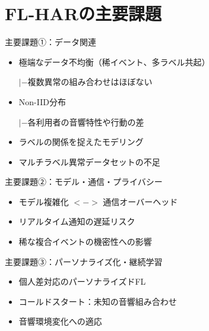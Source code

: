 \documentclass[unicode,12pt,aspectratio=169,dvipdfmx]{beamer}
\begin{document}
\section{FL-HARの主要課題}
\begin{frame}{主要課題①：データ関連}
  \begin{itemize}
    \item 極端なデータ不均衡（稀イベント、多ラベル共起）

    $|-$複数異常の組み合わせはほぼない
    \item Non-IID分布
    
    $|-$各利用者の音響特性や行動の差
    \item ラベルの関係を捉えたモデリング
    \item マルチラベル異常データセットの不足
  \end{itemize}
\end{frame}
\begin{frame}{主要課題②：モデル・通信・プライバシー}
  \begin{itemize}
    \item モデル複雑化 $<$$-$$>$ 通信オーバーヘッド
    \item リアルタイム通知の遅延リスク
    \item 稀な複合イベントの機密性への影響
  \end{itemize}
\end{frame}
\begin{frame}{主要課題③：パーソナライズ化・継続学習}
  \begin{itemize}
    \item 個人差対応のパーソナライズドFL
    \item コールドスタート：未知の音響組み合わせ
    \item 音響環境変化への適応
  \end{itemize}
\end{frame}
\end{document}
